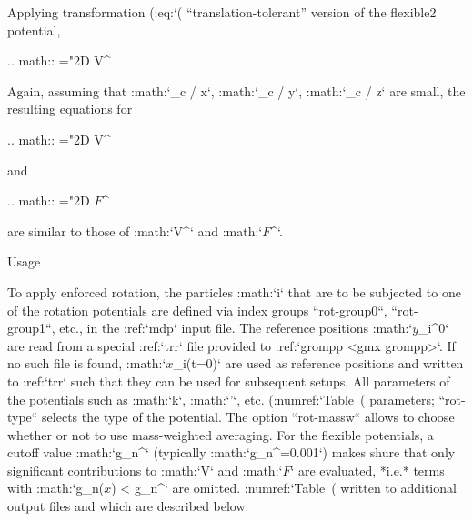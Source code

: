 Applying transformation (:eq:`(%
“translation-tolerant” version of the flexible2 potential,

.. math::
    \mathchardef\mhyphen="2D
    V{^}
    
Again, assuming that
:math:`_c / \partial x`,
:math:`_c /
\partial y`, :math:`_c / \partial z`
are small, the resulting equations for

.. math::
    \mathchardef\mhyphen="2D
    V{^}
    
and

.. math::
    \mathchardef\mhyphen="2D
    {\mbox{\boldmath ${F}$}}{^}
   
are similar
to those of :math:`V^` and
:math:`{\mbox{\boldmath ${F}$}}^`.

Usage
~~~~~

To apply enforced rotation, the particles :math:`i` that are to be
subjected to one of the rotation potentials are defined via index groups
``rot-group0``, ``rot-group1``, etc., in the
:ref:`mdp` input file. The reference positions
:math:`{\mbox{\boldmath ${y}$}}_i^0` are read from a special
:ref:`trr` file provided to :ref:`grompp <gmx grompp>`. If no such
file is found, :math:`{\mbox{\boldmath ${x}$}}_i(t=0)` are used as
reference positions and written to :ref:`trr` such that they
can be used for subsequent setups. All parameters of the potentials such
as :math:`k`, :math:`\epsilon'`, etc.
(:numref:`Table (%
parameters; ``rot-type`` selects the type of the potential.
The option ``rot-massw`` allows to choose whether or not to
use mass-weighted averaging. For the flexible potentials, a cutoff value
:math:`g_n^` (typically :math:`g_n^=0.001`)
makes shure that only significant contributions to :math:`V` and
:math:`{\mbox{\boldmath ${F}$}}` are evaluated, *i.e.* terms with
:math:`g_n({\mbox{\boldmath ${x}$}}) < g_n^` are omitted.
:numref:`Table (%
written to additional output files and which are described below.

